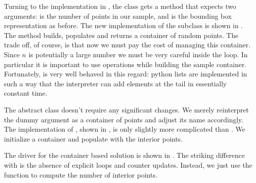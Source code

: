 Turning to the implementation in , the class
 gets a method  that expects two arguments:  is
the number of points in our sample, and  is the bounding box representation as
before.
%
%
The new implementation of the subclass  is shown in
. The method  builds, populates and returns a
container of  random points. The trade off, of course, is that now we must pay
the cost of managing this container. Since $n$ is potentially a large number we must be very
careful inside the  loop. In particular it is important to use 
operations while building the sample container. Fortunately,  is very well
behaved in this regard: python lists are implemented in such a way that the interpreter can add
elements at the tail in essentially constant time.
%
%

The abstract class  doesn't require any significant changes. We merely reinterpret
the dummy argument as a container of points and adjust its name accordingly.
%
%
The implementation of , shown in , is only slightly
more complicated than . We initialize a container  and
populate with the interior points.
%
%

The driver for the container based solution is shown in .
The striking difference with  is the absence of explicit loops and
counter updates. Instead, we just use the function  to compute the number of
interior points.
%
%

